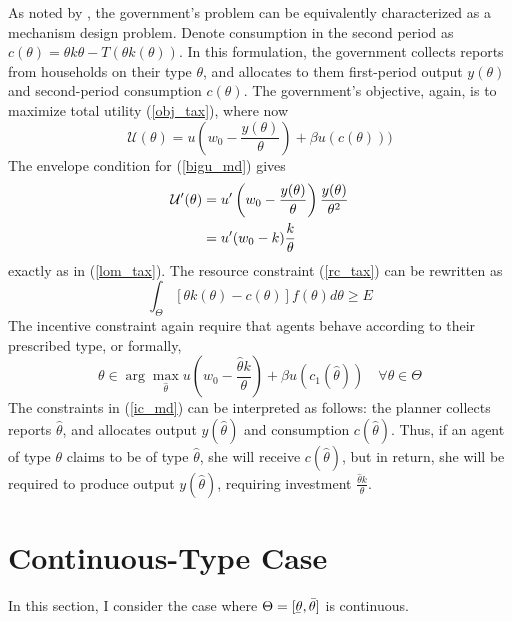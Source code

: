\documentclass[11pt]{article}
\newcommand{\ubar}[1]{\underaccent{\bar}{#1}}
\newcommand{\p}{\prime}
\newcommand{\U}{\mathcal{U}}
\begin{document}
As noted by \cite{mirrlees1971exploration}, the government's problem can be equivalently characterized as a mechanism design problem. Denote consumption in the second period as \( c(\theta) = \theta k\theta - T(\theta k(\theta)) \). In this formulation, the government collects reports from households on their type \( \theta \), and allocates to them first-period output \( y(\theta) \) and second-period consumption \( c(\theta) \). The government's objective, again, is to maximize total utility (\ref{obj_tax}), where now 
\begin{equation}
    \U(\theta) = u\left( w_0 - \frac{y(\theta)}{\theta} \right) + \beta u(c(\theta))) \label{bigu_md}
\end{equation}
The envelope condition for (\ref{bigu_md}) gives 
\begin{align}
    \U^\p(\theta) &= u^\p\left( w_0 - \frac{y(\theta)}{\theta} \right)\frac{y(\theta)}{\theta^2} \notag \\
    &= u^\p(w_0 - k)\frac{k}{\theta} 
\end{align}
exactly as in (\ref{lom_tax}). The resource constraint (\ref{rc_tax}) can be rewritten as 
\begin{equation}
    \int_\Theta \left[ \theta k(\theta) - c(\theta) \right]f(\theta) d\theta \geq E \label{rc_md}
\end{equation}
The incentive constraint again require that agents behave according to their prescribed type, or formally,
\begin{equation}
    \theta \in \arg\max_{\hat{\theta}} u\left( w_0 - \frac{\hat{\theta} k}{\theta} \right) + \beta u(c_1(\hat{\theta}))\quad \forall \theta\in\Theta \label{ic_md}
\end{equation}
The constraints in (\ref{ic_md}) can be interpreted as follows: the planner collects reports \( \hat{\theta} \), and allocates output \( y(\hat{\theta}) \) and consumption \( c(\hat{\theta}) \). Thus, if an agent of type \( \theta \) claims to be of type \( \hat{\theta} \), she will receive \( c(\hat{\theta}) \), but in return, she will be required to produce output \( y(\hat{\theta}) \), requiring investment \( \frac{\hat{\theta}k}{\theta} \). 

\section{Continuous-Type Case}

In this section, I consider the case where \( \Theta = [\ubar{\theta}, \bar{\theta}] \) is continuous. 
\end{document}
